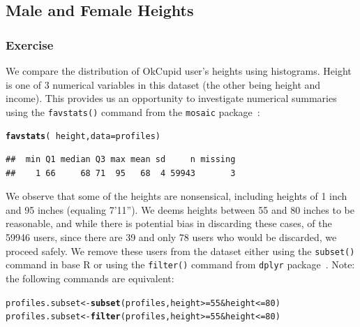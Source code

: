 \documentclass{article}\usepackage[]{graphicx}\usepackage[]{color}
\makeatletter
\newcommand{\hlnum}[1]{\textcolor[rgb]{0.686,0.059,0.569}{#1}}%
\newcommand{\hlopt}[1]{\textcolor[rgb]{0,0,0}{#1}}%
\newcommand{\hlstd}[1]{\textcolor[rgb]{0.345,0.345,0.345}{#1}}%
\newcommand{\hlkwb}[1]{\textcolor[rgb]{0.69,0.353,0.396}{#1}}%
\newcommand{\hlkwc}[1]{\textcolor[rgb]{0.333,0.667,0.333}{#1}}%
\newcommand{\hlkwd}[1]{\textcolor[rgb]{0.737,0.353,0.396}{\textbf{#1}}}%
\newenvironment{kframe}{%
 \def\at@end@of@kframe{}%
 \ifinner\ifhmode%
  \def\at@end@of@kframe{\end{minipage}}%
  \begin{minipage}{\columnwidth}%
 \fi\fi%
 \def\FrameCommand##1{\hskip\@totalleftmargin \hskip-\fboxsep
 \colorbox{shadecolor}{##1}\hskip-\fboxsep
     \hskip-\linewidth \hskip-\@totalleftmargin \hskip\columnwidth}%
 \MakeFramed {\advance\hsize-\width
   \@totalleftmargin\z@ \linewidth\hsize
   \@setminipage}}%
 {\par\unskip\endMakeFramed%
 \at@end@of@kframe}
\newenvironment{knitrout}{}{} %
\makeatother
\begin{document}
\subsection{Male and Female Heights}\label{section_height}
\subsubsection{Exercise}
We compare the distribution of OkCupid user's heights using histograms.  Height is one of 3 numerical variables in this dataset (the other being height and income).  This provides us an opportunity to investigate numerical summaries using the \verb#favstats()# command from the \verb#mosaic# package~\cite{mosaic}:

\begin{center}
\begin{knitrout}
\color{fgcolor}\begin{kframe}
\begin{alltt}
\hlkwd{favstats}\hlstd{(}\hlopt{~}\hlstd{height,} \hlkwc{data}\hlstd{=profiles)}
\end{alltt}
\begin{verbatim}
##  min Q1 median Q3 max mean sd     n missing
##    1 66     68 71  95   68  4 59943       3
\end{verbatim}
\end{kframe}
\end{knitrout}
\end{center}

We observe that some of the heights are nonsensical, including heights of 1 inch and 95 inches (equaling 7'11'').  We deems heights between 55 and 80 inches to be reasonable, and while there is potential bias in discarding these cases, of the 59946 users, since there are 39 and only 78 users who would be discarded, we proceed safely.  We remove these users from the dataset either using the \verb#subset()# command in base R or using the \verb#filter()# command from \verb#dplyr# package~\cite{dplyr}. Note: the following commands are equivalent:

\begin{knitrout}
\color{fgcolor}\begin{kframe}
\begin{alltt}
\hlstd{profiles.subset} \hlkwb{<-} \hlkwd{subset}\hlstd{(profiles, height}\hlopt{>=}\hlnum{55} \hlopt{&} \hlstd{height} \hlopt{<=}\hlnum{80}\hlstd{)}
\hlstd{profiles.subset} \hlkwb{<-} \hlkwd{filter}\hlstd{(profiles, height}\hlopt{>=}\hlnum{55} \hlopt{&} \hlstd{height} \hlopt{<=}\hlnum{80}\hlstd{)}
\end{alltt}
\end{kframe}
\end{knitrout}
\end{document}
